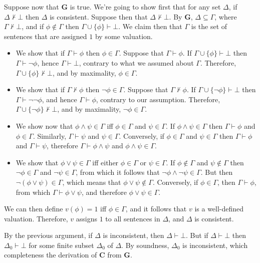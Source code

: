 Suppose now that \textbf{G} is true.  We're going to show first that
for any set $\Delta$, if $\Delta\not\vdash\bot$ then $\Delta$ is
consistent.  Suppose then that $\Delta\not\vdash\bot$.  By \textbf{G},
$\Delta\subseteq\Gamma$, where $\Gamma\not\vdash\bot$, and if
$\phi\not\in\Gamma$ then $\Gamma\cup \{\phi\}\vdash\bot$.  We claim
then that $\Gamma$ is the set of sentences that are assigned $1$ by
some valuation.
\begin{itemize}
\item We show that if $\Gamma\vdash\phi$ then $\phi\in \Gamma$.
  Suppose that $\Gamma\vdash\phi$.  If
  $\Gamma\cup \{ \phi \}\vdash\bot$ then $\Gamma\vdash\neg\phi$, hence
  $\Gamma\vdash\bot$, contrary to what we assumed about $\Gamma$.
  Therefore, $\Gamma\cup\{\phi \}\not\vdash\bot$, and by maximality,
  $\phi\in\Gamma$.
\item We show that if $\Gamma\not\vdash\phi$ then $\neg\phi\in\Gamma$.
  Suppose that $\Gamma\not\vdash\phi$.  If
  $\Gamma\cup \{ \neg \phi \}\vdash\bot$ then
  $\Gamma\vdash\neg\neg \phi$, and hence $\Gamma\vdash\phi$, contrary
  to our assumption.  Therefore,
  $\Gamma\cup \{\neg \phi \}\not\vdash\bot$, and by maximality,
  $\neg\phi\in\Gamma$.
\item We show now that $\phi\wedge\psi\in\Gamma$ iff $\phi\in\Gamma$
  and $\psi\in\Gamma$.  If $\phi\wedge\psi\in\Gamma$ then
  $\Gamma\vdash\phi$ and $\phi\in\Gamma$.  Similarly,
  $\Gamma\vdash\psi$ and $\psi\in\Gamma$.  Conversely, if
  $\phi\in\Gamma$ and $\psi\in\Gamma$ then $\Gamma\vdash\phi$ and
  $\Gamma\vdash\psi$, therefore $\Gamma\vdash\phi\wedge\psi$ and
  $\phi\wedge\psi\in\Gamma$.
\item We show that $\phi\vee\psi\in\Gamma$ iff either $\phi\in\Gamma$
  or $\psi\in\Gamma$.  If $\phi\not\in\Gamma$ and $\psi\not\in\Gamma$
  then $\neg\phi\in\Gamma$ and $\neg\psi\in\Gamma$, from which it
  follows that $\neg\phi\wedge\neg\psi\in\Gamma$.  But then
  $\neg (\phi\vee\psi)\in\Gamma$, which means that
  $\phi\vee\psi\not\in\Gamma$.  Conversely, if $\phi\in\Gamma$, then
  $\Gamma\vdash\phi$, from which $\Gamma\vdash\phi\vee\psi$, and
  therefore $\phi\vee\psi\in\Gamma$.  \end{itemize} We can then define
$v(\phi )=1$ iff $\phi\in\Gamma$, and it follows that $v$ is a
well-defined valuation.  Therefore, $v$ assigns $1$ to all sentences
in $\Delta$, and $\Delta$ is consistent.

By the previous argument, if $\Delta$ is inconsistent, then
$\Delta\vdash\bot$.  But if $\Delta\vdash\bot$ then
$\Delta _0\vdash\bot$ for some finite subset $\Delta _0$ of $\Delta$.
By soundness, $\Delta _0$ is inconsistent, which completeness the
derivation of \textbf{C} from \textbf{G}.

